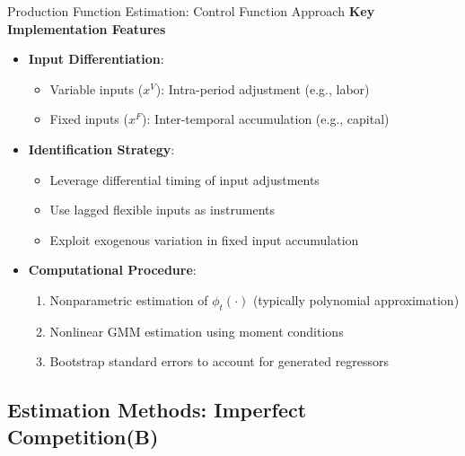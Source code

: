 \documentclass[aspectratio=169]{beamer}  %
\begin{document}
\begin{frame}{Production Function Estimation: Control Function Approach}
\textbf {Key Implementation Features}
\begin{itemize}
    \item \textbf{Input Differentiation}:
    \begin{itemize}
        \item Variable inputs ($x^V$): Intra-period adjustment (e.g., labor)
        \item Fixed inputs ($x^F$): Inter-temporal accumulation (e.g., capital)
    \end{itemize}
    
    \item \textbf{Identification Strategy}:
    \begin{itemize}
        \item Leverage differential timing of input adjustments
        \item Use lagged flexible inputs as instruments
        \item Exploit exogenous variation in fixed input accumulation
    \end{itemize}
    
    \item \textbf{Computational Procedure}:
    \begin{enumerate}
        \item Nonparametric estimation of $\phi_t(\cdot)$ (typically polynomial approximation)
        \item Nonlinear GMM estimation using moment conditions
        \item Bootstrap standard errors to account for generated regressors
    \end{enumerate}
\end{itemize}
\end{frame}




\subsection{Estimation Methods: Imperfect Competition(B)}
\end{document}

